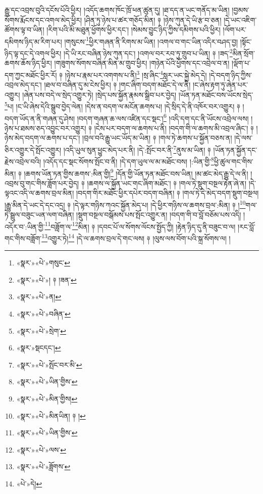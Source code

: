རྒྱུ་དང་འབྲས་བུའི་དངོས་པོའི་ཕྱིར། །འདོད་ཆགས་ཁོང་ཁྲོ་ཕན་ཚུན་དུ། །ཐ་དད་ན་ཡང་གནོད་མ་ཡིན། །བྱམས་སོགས་རྨོངས་དང་འགལ་མེད་ཕྱིར། །ཤིན་ཏུ་ཉེས་པ་ཚར་གཅོད་མིན། ༈ །ཉེས་ཀུན་དེ་ཡི་རྩ་བ་ཅན། །དེ་ཡང་འཇིག་ཚོགས་ལྟ་བ་ཡིན། །རིག་པའི་མི་མཐུན་ཕྱོགས་ཕྱིར་དང་། །སེམས་བྱུང་ཉིད་ཀྱིས་དམིགས་པའི་ཕྱིར། །ལོག་པར་དམིགས་ཉིད་མ་རིག་པར། །གསུངས་\footnote{«སྣར་»«པེ་»གསུང་}ཕྱིར་གཞན་ནི་རིགས་མ་ཡིན། །འགལ་བ་གང་ཡིན་འདིར་བཤད་བྱ། །སྟོང་ཉིད་ལྟ་དང་དེ་འགལ་ཕྱིར། །དེ་ཡི་རང་བཞིན་ཉེས་ཀུན་དང་། །འགལ་བར་རབ་ཏུ་གྲུབ་པ་ཡིན། ༈ །ཟད་\footnote{«སྣར་»«པེ་»། ༈ །ཟན་}མིན་སྲོག་ཆགས་ཆོས་ཉིད་ཕྱིར། །གཟུགས་སོགས་བཞིན་མིན་མ་གྲུབ་ཕྱིར། །གཉེན་པོའི་ཕྱོགས་དང་འབྲེལ་བ་ན། །ལྡོག་པ་དག་ཀྱང་མཐོང་ཕྱིར་རོ། ༈ །ཉེས་པ་རྣམ་པར་འགགས་པ་ནི།\footnote{«སྣར་»«པེ་»ན།} །སྲ་ཞིང་\footnote{«སྣར་»«པེ་»བཞིན་}སླར་ཡང་སྐྱེ་མེད་དེ། །དེ་བདག་ཉིད་ཀྱིས་འབྲལ་མེད་དང་། །ཐལ་བ་བཞིན་དུ་མ་ངེས་ཕྱིར། ༈ །གང་ཞིག་བདག་མཐོང་དེ་ལ་ནི། །ང་ཞེས་རྟག་ཏུ་ཞེན་པར་འགྱུར། །ཞེན་པས་བདེ་ལ་སྲེད་འགྱུར་ཏེ། །སྲེད་པས་སྐྱོན་རྣམས་སྒྲིབ་པར་བྱེད། །ཡོན་ཏན་མཐོང་བས་ཡོངས་སྲེད་\footnote{«སྣར་»«པེ་»སྲེག་}པ། །ང་ཡི་ཞེས་དེའི་སྒྲུབ་བྱེད་ལེན། །དེས་ན་བདག་ལ་མངོན་ཆགས་པ། །དེ་སྲིད་དེ་ནི་འཁོར་བར་འགྱུར། ༈ །བདག་ཡོད་ན་ནི་གཞན་དུ་ཤེས། །བདག་གཞན་ཆ་ལས་འཛིན་དང་སྡང་།\footnote{«སྣར་»སྡངདང་།} །འདི་དག་དང་ནི་ཡོངས་འབྲེལ་ལས། །ཉེས་པ་ཐམས་ཅད་འབྱུང་བར་འགྱུར། ༈ །ངེས་པར་བདག་ལ་ཆགས་པ་ནི། །བདག་གི་ལ་ཆགས་མི་འབྲལ་ཞིང་། ༈ །ཉེས་མེད་བདག་ལ་ཆགས་པ་དང་། །བྲལ་བའི་རྒྱུ་ཡང་ཡོད་མ་ཡིན། ༈ །གལ་ཏེ་ཆགས་པ་སྐྱོན་བཅས་ན། །དེ་ལས་ཅིར་འགྱུར་དེ་སྤོང་འགྱུར། །འདི་ཡུལ་སུན་ཕྱུང་མེད་པར་ནི། །དེ་:སྤོང་བར་ནི་\footnote{«སྣར་»«པེ་»སྤོང་བར་མི་}ནུས་མ་ཡིན། ༈ །ཡོན་ཏན་སྐྱོན་དང་རྗེས་འབྲེལ་བའི། །འདོད་དང་སྡང་སོགས་སྤོང་བ་ནི། །དེ་དག་ཡུལ་ལ་མ་མཐོང་བས། །:ཡིན་གྱི་\footnote{«སྣར་»«པེ་»ཡིན་གྱིས་}ཕྱི་ཚུལ་གང་གིས་མིན། ༈ །ཆགས་ཡོན་ཏན་གྱིས་ཆགས་:མིན་གྱི།\footnote{«སྣར་»«པེ་»མིན་གྱིས།} །དོན་གྱི་ཡོན་ཏན་མཐོང་བས་ཡིན། །མ་ཚང་མེད་རྒྱུ་དེ་ལ་ནི། །འབྲས་བུ་གང་གིས་ཟློག་པར་བྱེད། ༈ །ཆགས་ལ་སྐྱོན་ཡང་གང་ཞིག་མཐོང་། ༈ །གལ་ཏེ་སྡུག་བསྔལ་རྟེན་ཞེ་ན། །དེ་ལྟའང་འདི་ལ་ཆགས་བྲལ་མིན། །བདག་གིར་མཐོང་ཕྱིར་དཔེར་བདག་བཞིན། ༈ །གལ་ཏེ་དེ་མེད་བདག་སྡུག་བསྔལ། །རྒྱུ་མིན་དེ་ཡང་དེ་དང་འདྲ། ༈ །དེ་ལྟར་གཉིས་ཀའང་སྐྱོན་མེད་པ། །དེ་ཕྱིར་གཉིས་ལ་ཆགས་བྲལ་:མིན། ༈ །\footnote{«སྣར་»«པེ་»མིནཡིན། ༈ །}གལ་ཏེ་སྦྲུལ་བཟུང་ཡན་ལག་བཞིན། །སྡུག་བསྔལ་བསྒོམས་པས་སྤོང་འགྱུར་ན། །བདག་གི་བ་བློ་བཅོམ་པས་འདི། །འདོར་བ་:ཡིན་གྱི་\footnote{«སྣར་»«པེ་»ཡིན་གྱིས་}བཟློག་ལ་\footnote{«སྣར་»«པེ་»ལས་}མིན། ༈ །དབང་པོ་ལ་སོགས་ལོངས་སྤྱོད་ཀྱི། །རྟེན་ཉིད་དུ་ནི་བཟུང་བ་ལ། །རང་བློ་གང་གིས་བཟློག་\footnote{«སྣར་»«པེ་»ཟློགས་}འགྱུར་ཏེ།\footnote{«པེ་»དེ།} །དེ་ལ་ཆགས་བྲལ་དེ་གང་ལས། ༈ །ལུས་ལས་བོག་པའི་སྐྲ་སོགས་ལ། །
